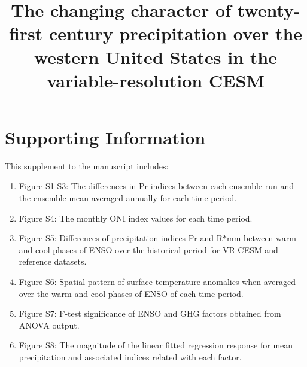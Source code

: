 \documentclass{ametsoc}
\title{The changing character of twenty-first century precipitation over the western United States in the variable-resolution CESM}
\affiliation{Department of Land, Air and Water Resources, University of California, Davis}
\begin{document}

\section{Supporting Information}

This supplement to the manuscript includes:

\begin{enumerate}

\item Figure S1-S3: The differences in Pr indices between each ensemble run and the ensemble mean averaged annually for each time period.

\item Figure S4: The monthly ONI index values for each time period.

\item Figure S5: Differences of precipitation indices Pr and R$\ast$mm between warm and cool phases of ENSO over the historical period for VR-CESM and reference datasets.

\item Figure S6: Spatial pattern of surface temperature anomalies when averaged over the warm and cool phases of ENSO of each time period.

\item Figure S7: F-test significance of ENSO and GHG factors obtained from ANOVA output.

\item Figure S8: The magnitude of the linear fitted regression response for mean precipitation and associated indices related with each factor.

\end{enumerate}


%

\end{document}
